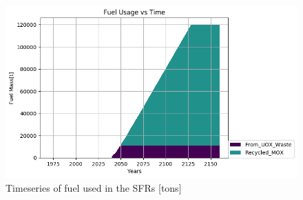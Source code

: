 \begin{figure}[htbp!]
	\begin{center}
		\includegraphics{./images/where_fuel.png}
	\end{center}
	\caption{Timeseries of fuel used in the \gls{SFR}s [tons]}
	\label{fig:fuel}
\end{figure}

\begin{table}[h]
	\centering
		\caption {\gls{SFR} Simulation Results}
		\label{tab:sfr_sim_result}
\end {table}



